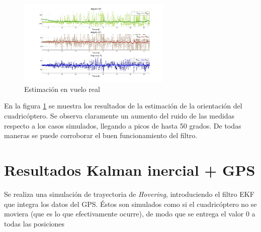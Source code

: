 \documentclass[main]{subfiles}
\begin{document}
\begin{figure}
	\vspace{-40pt}
	\begin{center}
          \hspace{-50pt}
	\vspace{-30pt}
	\includegraphics[width=0.65\textwidth]
		{./pics_kalman/andando.pdf}
	\end{center}
	\caption{Estimación en vuelo real}
	\label{fig:andando}
\end{figure}

En la figura \ref{fig:andando} se muestra los resultados de la estimación de la orientación del cuadricóptero. Se observa claramente un aumento del ruido de las medidas respecto a los casos simulados, llegando a picos de hasta 50 grados. De todas maneras se puede corroborar el buen funcionamiento del filtro.\\

\section{Resultados Kalman inercial + GPS}

Se realiza una simulación de trayectoria de \emph{Hovering}, introduciendo el filtro EKF que integra los datos del GPS. Éstos son simulados como si el cuadricóptero no se moviera (que es lo que efectivamente ocurre), de modo que se entrega el valor 0 a todas las posiciones
\end{document}
